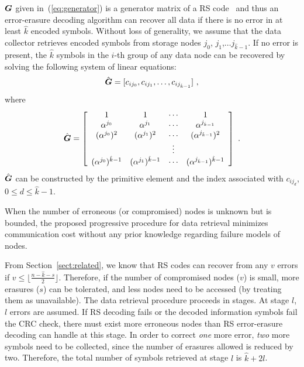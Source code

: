 \documentclass[10pt,journal,letterpaper,compsoc]{IEEEtran}
\newcommand{\bm}{\boldmath}
\newcommand{\0}{{\bf 0}}
\newcommand{\G}{\mbox{\bm $G$}}
\begin{document}
$\G$ given in~(\ref{eq:generator}) is a generator
matrix of a RS code~\cite{MOO05} and thus an error-erasure decoding algorithm
can recover all data if there is no error in at least $\hat{k}$ encoded symbols.  Without loss
of generality, we assume that the data collector retrieves encoded symbols from
storage nodes $j_0$, $j_1$,$\ldots j_{\hat{k}-1}$. If no error is
present, the $\hat{k}$ symbols in the $i$-th group of any data node can be
recovered by solving the following system of linear equations:
\begin{eqnarray}
[u_{i0},u_{i1},\ldots,u_{i(\hat{k}-1)}]\hat{\G}=[c_{ij_0},c_{ij_1},\ldots,c_{ij_{\hat{k}-1}}]~,\label{uGc}
\end{eqnarray}
where
$$\hat{\G}=\left[\begin{array}{cccc} 1&1&\cdots&1\\
\alpha^{j_0}&\alpha^{j_1}&\cdots&\alpha^{j_{\hat{k}-1}}\\
(\alpha^{j_0})^2&(\alpha^{j_1})^2&\cdots&(\alpha^{j_{\hat{k}-1}})^2\\
&&\vdots&\\
(\alpha^{j_0})^{\hat{k}-1}&(\alpha^{j_1})^{\hat{k}-1}&\cdots&(\alpha^{j_{\hat{k}-1}})^{\hat{k}-1}
\end{array}\right]~.$$ $\hat{\G}$ can be constructed by the primitive element
and the index associated with $c_{ij_d}$, $0\le d\le \hat{k}-1$.  

When the number of erroneous (or compromised) nodes is unknown but is bounded, the
proposed progressive  procedure for data retrieval
minimizes communication cost without any prior knowledge regarding
failure models of nodes.

From Section~\ref{sect:related}, we know that RS codes can recover from any $v$ errors if
$v \le \lfloor\frac{n-\hat{k}-s}{2}\rfloor$. Therefore, if the number of compromised
nodes ($v$) is small, more erasures ($s$) can be tolerated, and less nodes need
to be accessed (by treating them as unavailable). The data retrieval procedure
proceeds in stages. At stage $l$, $l$ errors are assumed. If RS decoding fails
or the decoded information symbols fail the CRC check, there must exist more
erroneous nodes than RS error-erasure decoding can handle at this stage. In
order to correct {\it one} more error, {\it two} more symbols need to be collected,
since the number of erasures allowed is reduced by two. Therefore, the total
number of symbols retrieved at stage $l$ is $\hat{k}+2l$. 
\end{document}

